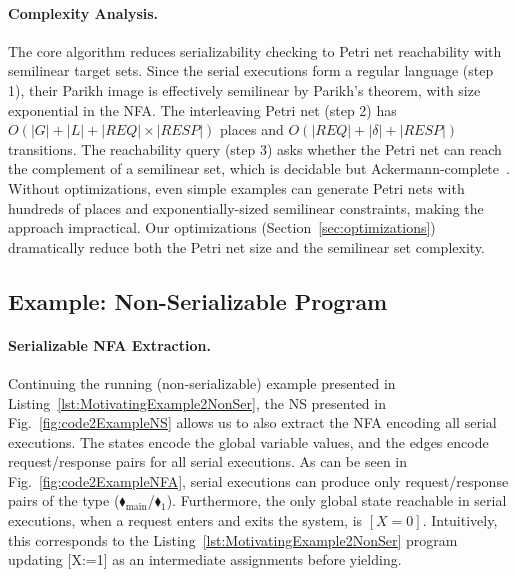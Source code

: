 \paragraph{Complexity Analysis.}
The core algorithm reduces serializability checking to Petri net reachability with semilinear target sets. 
Since the serial executions form a regular language (step 1), their Parikh image is effectively semilinear by Parikh's theorem, with size exponential in the NFA.
The interleaving Petri net (step 2) has $O(|G| + |L| + |\mathit{REQ}| \times |\mathit{RESP}|)$ places and $O(|\mathit{REQ}| + |\delta| + |\mathit{RESP}|)$ transitions.
The reachability query (step 3) asks whether the Petri net can reach the complement of a semilinear set, which is decidable but Ackermann-complete~\cite{CzWo22}.
Without optimizations, even simple examples can generate Petri nets with hundreds of places and exponentially-sized semilinear constraints, making the approach impractical.
Our optimizations (Section~\ref{sec:optimizations}) dramatically reduce both the Petri net size and the semilinear set complexity.


%


\subsection{Example: Non-Serializable Program}
\label{subsec:ns-not-serializable}

\paragraph{Serializable NFA Extraction.}

Continuing the running (non-serializable) example presented in Listing~\ref{lst:MotivatingExample2NonSer}, the NS presented in Fig.~\ref{fig:code2ExampleNS} allows us to also extract the NFA encoding all serial executions. The states encode the global variable values, and the edges encode request/response pairs for all serial executions. As can be seen in Fig.~\ref{fig:code2ExampleNFA}, serial executions can produce only request/response pairs of the type ({\color{ForestGreen}$\blacklozenge_\text{main}$/{\color{red}$\blacklozenge_1$}}). Furthermore, the only global state reachable in serial executions, when a request enters and exits the system, is $[X=0]$.
%
Intuitively, this corresponds to the Listing~\ref{lst:MotivatingExample2NonSer} program updating [X:=1] as an intermediate assignments before yielding.


